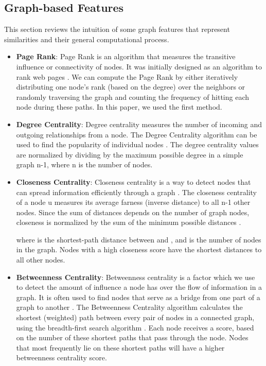 \documentclass[a4paper,fleqn]{cas-dc}
\begin{document}
\subsection{Graph-based Features}
\label{gbfeatures}
This section reviews the intuition of some graph features that represent similarities and their general computational process.
\begin{itemize}

	\item \textbf{Page Rank}: Page Rank is an algorithm that measures the transitive influence or connectivity of nodes. It was initially designed as an algorithm to rank web pages \citep{54xing2004a}. We can compute the Page Rank by either iteratively distributing one node's rank (based on the degree) over the neighbors or randomly traversing the graph and counting the frequency of hitting each node during these paths. In this paper, we used the first method.

	\item \textbf{Degree Centrality}: Degree centrality measures the number of incoming and outgoing relationships from a node. The Degree Centrality algorithm can be used to find the popularity of individual nodes \citep{46freeman1979a}. The degree centrality values are normalized by dividing by the maximum possible degree in a simple graph n-1, where n is the number of nodes.

	\item \textbf{Closeness Centrality}: Closeness centrality is a way to detect nodes that can spread information efficiently through a graph \citep{46freeman1979a}. The closeness centrality of a node u measures its average farness (inverse distance) to all n-1 other nodes. Since the sum of distances depends on the number of graph nodes, closeness is normalized by the sum of the minimum possible distances .

	      

	      where  is the shortest-path distance between  and , and  is the number of nodes in the graph. Nodes with a high closeness score have the shortest distances to all other nodes.

	\item \textbf{Betweenness Centrality}: Betweenness centrality is a factor which we use to detect the amount of influence a node has over the flow of information in a graph. It is often used to find nodes that serve as a bridge from one part of a graph to another \citep{55moore1959a}. The Betweenness Centrality algorithm calculates the shortest (weighted) path between every pair of nodes in a connected graph, using the breadth-first search algorithm \citep{55moore1959a}. Each node receives a score, based on the number of these shortest paths that pass through the node. Nodes that most frequently lie on these shortest paths will have a higher betweenness centrality score.


\end{itemize}
\end{document}
